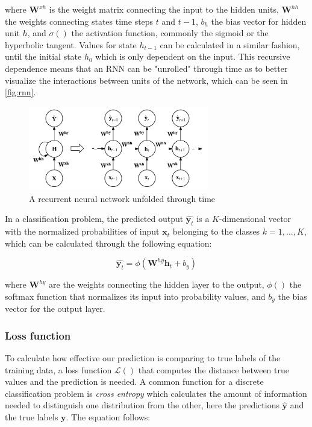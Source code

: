 \documentclass{kththesis}
\begin{document}
where $\mathbf{W}^{xh}$ is the weight matrix connecting the input to the hidden units, $\mathbf{W}^{hh}$ the weights connecting states time steps $t$ and $t-1$, $b_h$ the bias vector for hidden unit $h$, and $\sigma()$ the activation function, commonly the sigmoid or the hyperbolic tangent. Values for state $h_{t-1}$ can be calculated in a similar fashion, until the initial state $h_0$ which is only dependent on the input. This recursive dependence means that an RNN can be "unrolled" through time as to better visualize the interactions between units of the network, which can be seen in \autoref{fig:rnn}.

\begin{figure}[h]
    \centering
    \includegraphics[width=0.7\textwidth,keepaspectratio]{figures/rnn.pdf}
    \caption{A recurrent neural network unfolded through time}
    \label{fig:rnn}
\end{figure}

In a classification problem, the predicted output $\hat{\mathbf{y}_t}$ is a $K$-dimensional vector with the normalized probabilities of input $\mathbf{x}_t$ belonging to the classes $k=1,...,K$, which can be calculated through the following equation:

\begin{equation}
\hat{\mathbf{y}_t} = \phi(\mathbf{W}^{hy}\mathbf{h}_t + b_y)
\end{equation}

where $\mathbf{W}^{hy}$ are the weights connecting the hidden layer to the output, $\phi()$ the softmax function that normalizes its input into probability values, and $b_y$ the bias vector for the output layer. 

\subsubsection{Loss function}

To calculate how effective our prediction is comparing to true labels of the training data, a loss function $\mathcal{L}()$ that computes the distance between true values and the prediction is needed. A common function for a discrete classification problem is \emph{cross entropy} which calculates the amount of information needed to distinguish one distribution from the other, here the predictions $\hat{\mathbf{y}}$ and the true labels $\mathbf{y}$. The equation follows:
\end{document}
